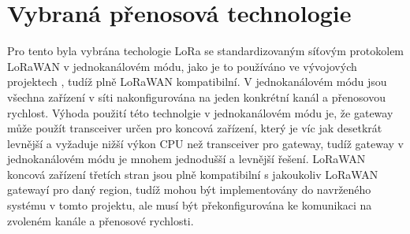 \section{Vybraná přenosová technologie}
Pro tento \DIFdelbegin {}\DIFdelend \DIFaddbegin {}\DIFaddend byla vybrána techologie LoRa se standardizovaným síťovým protokolem LoRaWAN v jednokanálovém módu, jako je to používáno ve vývojových projektech \cite{Analysis of Propagation Link for Remote Weather}, tudíž \DIFdelbegin {}\DIFdelend \DIFaddbegin {}\DIFaddend plně LoRaWAN kompatibilní.
V jednokanálovém módu jsou všechna zařízení v síti nakonfigurována na jeden konkrétní kanál a přenosovou rychlost.
Výhoda použití této technolgie v jednokanálovém módu je, že gateway může použít transceiver určen pro koncová zařízení, který je víc jak desetkrát levnější a vyžaduje nižší výkon CPU než transceiver pro gateway, tudíž gateway v jednokanálovém módu je mnohem jednodušší a levnější řešení.
LoRaWAN koncová zařízení třetích stran jsou plně kompatibilní s jakoukoliv LoRaWAN gatewayí pro daný region, tudíž mohou být implementovány do navrženého systému v tomto projektu, ale musí být překonfigurována ke komunikaci na zvoleném kanále a přenosové rychlosti. 







